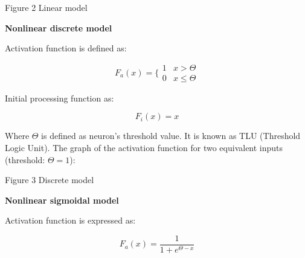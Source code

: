 \documentclass[10pt,oneside]{memoir}
\begin{document}
Figure 2 Linear model


\textbf{Nonlinear discrete model}


Activation function is defined as:


\begin{equation}
{F}_{a}\left(x\right)=\{\begin{array}{ll}1& x>\Theta \\ 0& x\le \Theta \end{array}
\end{equation}


Initial processing function as:


\begin{equation}
{F}_{i}\left(x\right)=x
\end{equation}


Where $ \Theta $ is defined as neuron's threshold value. It is known as TLU (Threshold Logic Unit). The graph of the activation function for two equivalent inputs (threshold: $ \Theta =1$):


\begin{figure}
\begin{center}
\end{center}
\label{figure3}
\end{figure}

Figure 3 Discrete model


\textbf{Nonlinear sigmoidal model}


Activation function is expressed as:


\begin{equation}
{F}_{a}\left(x\right)=\frac{1}{1+{e}^{\Theta -x}}
\end{equation}
\end{document}
